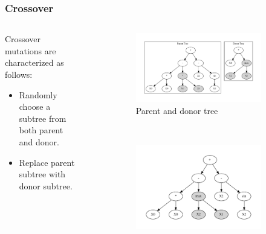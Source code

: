 \documentclass{beamer}
\begin{document}
\begin{frame}
  \frametitle{Crossover}
  \begin{columns}
    \begin{column}{0.3\textwidth}
      Crossover mutations are characterized as follows:
      \begin{itemize}
        \item Randomly choose a subtree from both parent and donor. 
        \item Replace parent subtree with donor subtree.
      \end{itemize}
    \end{column}

    \begin{column}{0.6\textwidth}
      \begin{figure}
        \centering
        \begin{subfigure}{0.6\textwidth}
          \includegraphics[scale=0.21]{images/graphviz/crossover_before.dot.pdf}
          \caption{Parent and donor tree}
          \label{fig:crossover_muta}
        \end{subfigure}%
        \\
        \begin{subfigure}{0.6\textwidth}
          \centering
          \includegraphics[scale=0.21]{images/graphviz/crossover_after.dot.pdf}

\end{subfigure}
\end{figure}
\end{column}
\end{columns}
\end{frame}
\end{document}
